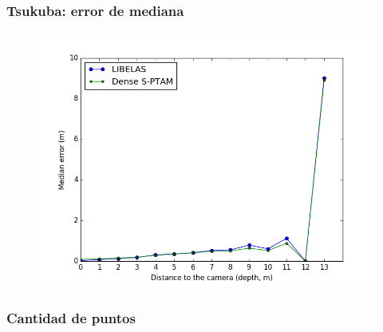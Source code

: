 \documentclass[compress]{beamer}
\begin{document}
\begin{frame}
	\frametitle{Tsukuba: error de mediana}
	\begin{figure}[!htb]
		\centering
		\includegraphics[width=0.8\columnwidth]{images/medians_comparison_tsukuba}
		\label{fig:median_comparison_tsukuba}
	\end{figure}
\end{frame}

\begin{frame}
	\frametitle{Cantidad de puntos}
	\begin{figure}[!htb]
		\centering
		\hfil
	\end{figure}
\end{frame}
	
\end{document}
